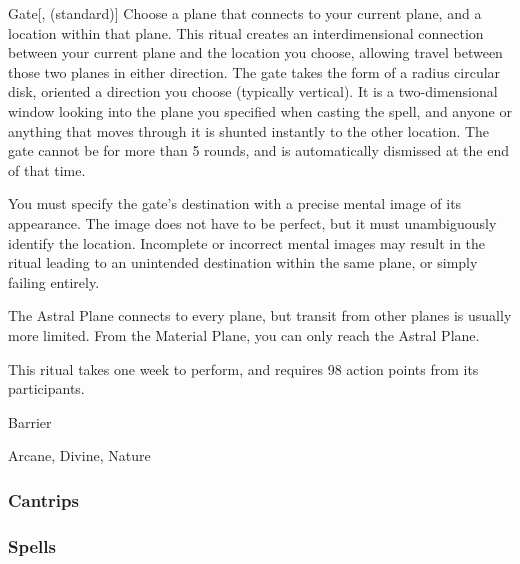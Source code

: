 \lowercase{\hypertarget{spell:Gate}{}}\label{spell:Gate}
\begin{apability}[Rank 8]{\hypertarget{spell:Gate}{Gate}}[,  (standard)]
Choose a plane that connects to your current plane, and a location within that plane.
This ritual creates an interdimensional connection between your current plane and the location you choose, allowing travel between those two planes in either direction.
The gate takes the form of a \areasmall radius circular disk, oriented a direction you choose (typically vertical).
It is a two-dimensional window looking into the plane you specified when casting the spell, and anyone or anything that moves through it is shunted instantly to the other location.
The gate cannot be  for more than 5 rounds, and is automatically dismissed at the end of that time.

You must specify the gate's destination with a precise mental image of its appearance.
The image does not have to be perfect, but it must unambiguously identify the location.
Incomplete or incorrect mental images may result in the ritual leading to an unintended destination within the same plane, or simply failing entirely.

The Astral Plane connects to every plane, but transit from other planes is usually more limited.
From the Material Plane, you can only reach the Astral Plane.

This ritual takes one week to perform, and requires 98 action points from its participants.
\end{apability}
\vspace{0.25em}


\newpage
\begin{spellsection}{Barrier}

\begin{spellheader}
\end{spellheader}


 Arcane, Divine, Nature

\subsubsection{Cantrips}


\end{spellsection}


\subsubsection{Spells}


